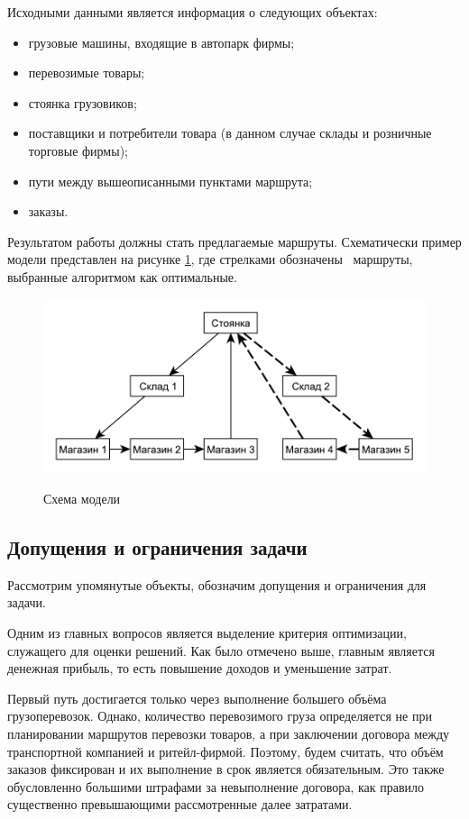 	Исходными данными является информация о следующих объектах:
	\begin{itemize}
		\item грузовые машины, входящие в автопарк фирмы;
		\item перевозимые товары;
		\item стоянка грузовиков;
		\item поставщики и потребители товара (в данном случае склады и розничные торговые фирмы);
		\item пути между вышеописанными пунктами маршрута;
		\item заказы.
	\end{itemize}

	Результатом работы должны стать предлагаемые маршруты. Схематически пример модели представлен на рисунке \ref{pic:model}, где стрелками обозначены \, маршруты, выбранные алгоритмом как оптимальные.
	
	\begin{figure}[h!] 
		\begin{center}
			{\includegraphics[scale=0.9, angle=0]{img/model.pdf}}
			\caption{Схема модели}
			\label{pic:model}
		\end{center}
	\end{figure}
	
	\subsection{Допущения и ограничения задачи}
	Рассмотрим упомянутые объекты, обозначим допущения и ограничения для задачи.
	
	Одним из главных вопросов является выделение критерия оптимизации, служащего для оценки решений. Как было отмечено выше, главным является денежная прибыль, то есть повышение доходов и уменьшение затрат.   
	
	Первый путь достигается только через выполнение большего объёма грузоперевозок. Однако, количество перевозимого груза определяется не при планировании маршрутов перевозки товаров, а при заключении договора между транспортной компанией и ритейл-фирмой. Поэтому, будем считать, что объём заказов фиксирован и их выполнение в срок является обязательным. Это также обусловленно большими штрафами за невыполнение договора, как правило существенно превышающими рассмотренные далее затратами.
	
